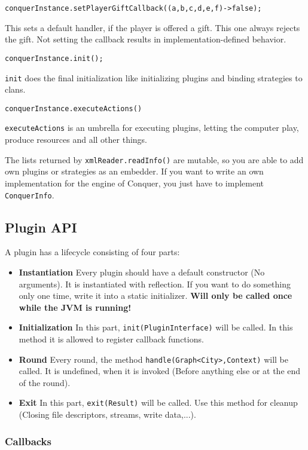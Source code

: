 \documentclass{article}
\begin{document}
\begin{verbatim}
conquerInstance.setPlayerGiftCallback((a,b,c,d,e,f)->false);
\end{verbatim}
This sets a default handler, if the player is offered a gift. This one always rejects the gift. Not setting the callback results in implementation-defined behavior.
\begin{verbatim}
conquerInstance.init();
\end{verbatim}
\texttt{init} does the final initialization like initializing plugins and binding strategies to clans.
\begin{verbatim}
conquerInstance.executeActions()
\end{verbatim}
\texttt{executeActions} is an umbrella for executing plugins, letting the computer play, produce resources and all other things.\newline

The lists returned by \texttt{xmlReader.readInfo()} are mutable, so you are able to add own plugins or strategies as an embedder.\newline
If you want to write an own implementation for the engine of Conquer, you just have to implement \texttt{ConquerInfo}.

\subsection{Plugin API}
A plugin has a lifecycle consisting of four parts:
\begin{itemize}
	\item \textbf{Instantiation} Every plugin should have a default constructor (No arguments). It is instantiated with reflection. If you want to do something only one time, write it into a static initializer. \textbf{Will only be called once while the JVM is running!}
	\item \textbf{Initialization} In this part, \texttt{init(PluginInterface)} will be called. In this method it is allowed to register callback functions. 
	\item \textbf{Round} Every round, the method \texttt{handle(Graph<City>,Context)} will be called. It is undefined, when it is invoked (Before anything else or at the end of the round).
	\item \textbf{Exit} In this part, \texttt{exit(Result)} will be called. Use this method for cleanup (Closing file descriptors, streams, write data,...).
	
\end{itemize}
\subsubsection{Callbacks}
\end{document}
